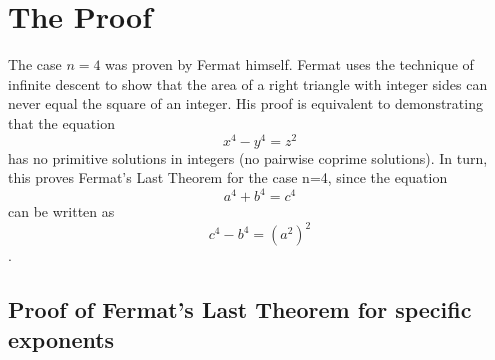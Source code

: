 \documentclass[12pt, a4paper, twoside]{article}
\numberwithin{equation}{section}
\begin{document}
\section{The Proof}
The case $n=4$ was proven by Fermat himself. Fermat uses the technique of infinite descent to show that the area of a right triangle with integer sides can never equal the square of an integer. His proof is equivalent to demonstrating that the equation $$x^4 - y^4 = z^2$$ has no primitive solutions in integers (no pairwise coprime solutions). In turn, this proves Fermat's Last Theorem for the case n=4, since the equation $$a^4 + b^4 = c^4$$ can be written as $$c^4-b^4 = (a^2)^2$$. 
\subsection{Proof of Fermat's Last Theorem for specific exponents}
\end{document}
